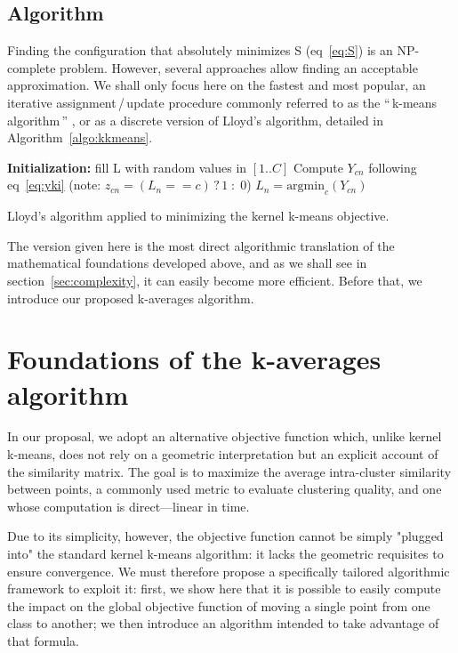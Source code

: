 \documentclass[twoside,11pt]{article}
\newcommand{\cad}{---} %
\newcommand{\gl}[1]{``\,#1\,''} %
\begin{document}
\subsection{Algorithm}

Finding the configuration that absolutely minimizes S (eq~\ref{eq:S}) is an NP-complete problem. However, several approaches allow finding an acceptable approximation. We shall only focus here on the fastest and most popular, an iterative assignment\,/\,update procedure commonly referred to as the \gl{k-means algorithm} \citep{macQueenBsmsp67}, or as a discrete version of Lloyd's algorithm, detailed in Algorithm~\ref{algo:kkmeans}.

\begin{algorithm}
	\label{algo:kkmeans}
	\SetAlgoLined
	\BlankLine	
	\textbf{Initialization:} fill L with random values in $[1..C]$\;
	\BlankLine	
	 {
		 {
			 {
				Compute $Y_{cn}$ following eq~\ref{eq:yki} \label{algline:kkmeans_cplx1}
				(note: $z_{cn} = (L_n == c)\,?\,1\;:\;0$)
			}
			$L_n = \textrm{argmin}_c (Y_{cn})$\;
		}
	}
	\BlankLine
	\caption{Lloyd's algorithm applied to minimizing the kernel k-means objective.}
\end{algorithm}

The version given here is the most direct algorithmic translation of the mathematical foundations developed above, and as we shall see in section~\ref{sec:complexity}, it can easily become more efficient. Before that, we introduce our proposed k-averages algorithm.


\section{Foundations of the k-averages algorithm} \label{sec:kaverages}

In our proposal, we adopt an alternative objective function which, unlike kernel k-means, does not rely on a geometric interpretation but an explicit account of the similarity matrix. The goal is to maximize the average intra-cluster similarity between points, a commonly used metric to evaluate clustering quality, and one whose computation is direct\cad{}linear in time.

Due to its simplicity, however, the objective function cannot be simply "plugged into" the standard kernel k-means algorithm: it lacks the geometric requisites to ensure convergence. We must therefore propose a specifically tailored algorithmic framework to exploit it: first, we show here that it is possible to easily compute the impact on the global objective function of moving a single point from one class to another; we then introduce an algorithm intended to take advantage of that formula.
\end{document}
